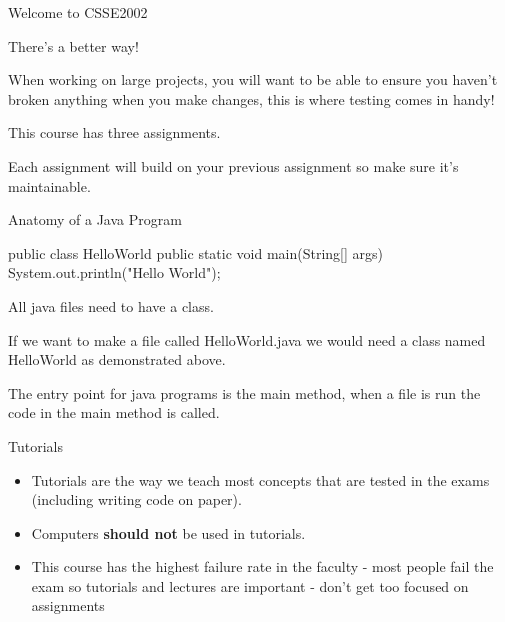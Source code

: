 \documentclass[week2]{csse2002}
\begin{document}
\begin{topic}{Welcome to CSSE2002}
\begin{subtopic}{5}
There's a better way!
\end{subtopic}

\begin{subtopic}{6}
When working on large projects, you will want to be able to ensure you haven't broken anything when you make changes, this is where testing comes in handy!
\end{subtopic}

\begin{subtopic}{7}
This course has three assignments.

Each assignment will build on your previous assignment so make sure it's maintainable.
\end{subtopic}

\end{topic}

\begin{topic}{Anatomy of a Java Program}
\begin{java}
public class HelloWorld {
    public static void main(String[] args) {
        System.out.println("Hello World");
    }
}
\end{java}

All java files need to have a class.

If we want to make a file called HelloWorld.java we would need a class named HelloWorld as demonstrated above.

The entry point for java programs is the main method, when a file is run the code in the main method is called.
\end{topic}

\begin{topic}{Tutorials}
\begin{itemize}
\item Tutorials are the way we teach most concepts that are tested in the exams (including writing code on paper).

\item Computers \textbf{should not} be used in tutorials.

\item This course has the highest failure rate in the faculty - most people fail the exam so tutorials and lectures are important - don't get too focused on assignments
\end{itemize}
\end{topic}
\end{document}

